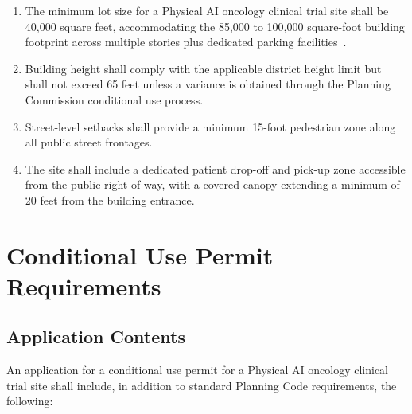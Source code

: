 \begin{enumerate}[label=(\alph*)]
\item The minimum lot size for a Physical AI oncology clinical trial site shall
  be 40,000 square feet, accommodating the 85,000 to 100,000 square-foot
  building footprint across multiple stories plus dedicated parking
  facilities~\cite{sitespec2026}.

\item Building height shall comply with the applicable district height limit
  but shall not exceed 65 feet unless a variance is obtained through the
  Planning Commission conditional use process.

\item Street-level setbacks shall provide a minimum 15-foot pedestrian zone
  along all public street frontages.

\item The site shall include a dedicated patient drop-off and pick-up zone
  accessible from the public right-of-way, with a covered canopy extending a
  minimum of 20 feet from the building entrance.
\end{enumerate}

\section{Conditional Use Permit Requirements}

\subsection{Application Contents}

An application for a conditional use permit for a Physical AI oncology clinical
trial site shall include, in addition to standard Planning Code requirements,
the following:

